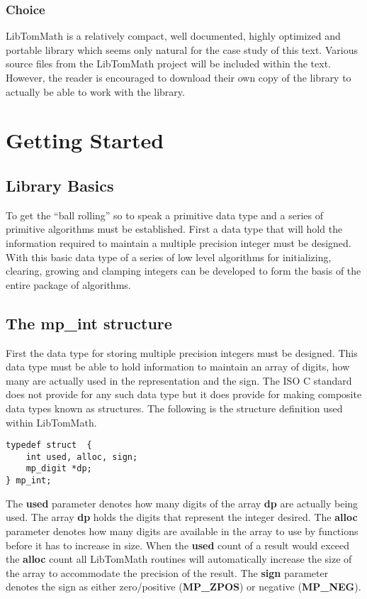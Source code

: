 \documentclass[b5paper]{book}
\begin{document}
\subsection{Choice}
LibTomMath is a relatively compact, well documented, highly optimized and portable library which seems only natural for
the case study of this text.  Various source files from the LibTomMath project will be included within the text.  However, the 
reader is encouraged to download their own copy of the library to actually be able to work with the library.  

\chapter{Getting Started}
\section{Library Basics}
To get the ``ball rolling'' so to speak a primitive data type and a series of primitive algorithms must be established.  First a data
type that will hold the information required to maintain a multiple precision integer must be designed.  With this basic data type of a series
of low level algorithms for initializing, clearing, growing and clamping integers can be developed to form the basis of the entire
package of algorithms.

\section{The mp\_int structure}
First the data type for storing multiple precision integers must be designed.  This data type must be able to hold information to 
maintain an array of digits, how many are actually used in the representation and the sign.  The ISO C standard does not provide for 
any such data type but it does provide for making composite data types known as structures.  The following is the structure definition 
used within LibTomMath.

\begin{verbatim}
typedef struct  {
    int used, alloc, sign;
    mp_digit *dp;
} mp_int;
\end{verbatim}

The \textbf{used} parameter denotes how many digits of the array \textbf{dp} are actually being used.  The array 
\textbf{dp} holds the digits that represent the integer desired.  The \textbf{alloc} parameter denotes how 
many digits are available in the array to use by functions before it has to increase in size.  When the \textbf{used} count 
of a result would exceed the \textbf{alloc} count all LibTomMath routines will automatically increase the size of the 
array to accommodate the precision of the result.  The \textbf{sign} parameter denotes the sign as either zero/positive 
(\textbf{MP\_ZPOS}) or negative (\textbf{MP\_NEG}).  
\end{document}
